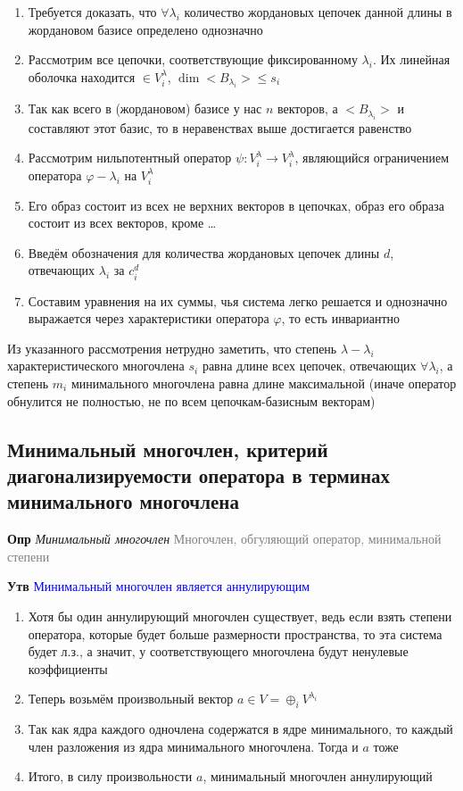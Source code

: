 \begin{enumerate}
    \item Требуется доказать, что $\forall \lambda_i$ количество жордановых цепочек данной длины в жордановом базисе
    определено однозначно
    \item Рассмотрим все цепочки, соответствующие фиксированному $\lambda_i$.
    Их линейная оболочка находится $\in V^\lambda_i$, $\dim <B_\lambda_i> \leq s_i$
    \item Так как всего в (жордановом) базисе у нас $n$ векторов, а  $<B_\lambda_i>$ и составляют этот базис, то в
    неравенствах выше достигается равенство
    \item Рассмотрим нильпотентный оператор $\psi: V^\lambda_i \rightarrow V^\lambda_i$, являющийся ограничением
    оператора $\varphi - \lambda_i$ на $V^\lambda_i$
    \item Его образ состоит из всех не верхних векторов в цепочках, образ его образа состоит из всех векторов, кроме \ldots
    \item Введём обозначения для количества жордановых цепочек длины $d$, отвечающих $\lambda_i$ за $c_i^d$
    \item Составим уравнения на их суммы, чья система легко решается и однозначно выражается через характеристики
    оператора $\varphi$, то есть инвариантно
\end{enumerate}

Из указанного рассмотрения нетрудно заметить, что степень $\lambda - \lambda_i$ характеристического многочлена $s_i$
равна длине всех цепочек, отвечающих $\forall \lambda_i$, а степень $m_i$ минимального многочлена равна длине
максимальной (иначе оператор обнулится не полностью, не по всем цепочкам-базисным векторам)

\subsection{Минимальный многочлен, критерий диагонализируемости оператора в терминах минимального многочлена}

\textbf{Опр} \textit{Минимальный многочлен} \textcolor{gray}{Многочлен, обгуляющий оператор, минимальной степени}

\textbf{Утв} \textcolor{blue}{Минимальный многочлен является аннулирующим}

\begin{enumerate}
    \item Хотя бы один аннулирующий многочлен существует, ведь если взять степени оператора, которые будет больше
    размерности пространства, то эта система будет л.з., а значит, у соответствующего многочлена будут ненулевые
    коэффициенты
    \item Теперь возьмём произвольный вектор $a \in V = \oplus_i V^{\lambda_i}$
    \item Так как ядра каждого одночлена содержатся в ядре минимального, то каждый член разложения из ядра
    минимального многочлена.
    Тогда и $a$ тоже
    \item Итого, в силу произвольности $a$, минимальный многочлен аннулирующий
\end{enumerate}

